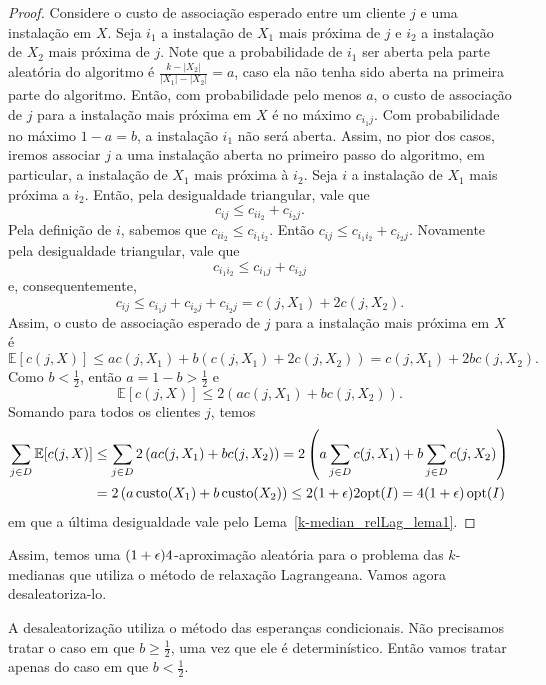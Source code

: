 \begin{proof}
Considere o custo de associação esperado entre um cliente $j$ e uma instalação em $X$. Seja $i_1$ a instalação de $X_1$ mais próxima de $j$ e $i_2$ a instalação de $X_2$ mais próxima de $j$. Note que a probabilidade de $i_1$ ser aberta pela parte aleatória do algoritmo é $\frac{k - |X_2|}{|X_1| - |X_2|} = a$, caso ela não tenha sido aberta na primeira parte do algoritmo. Então, com probabilidade pelo menos $a$, o custo de associação de $j$ para a instalação mais próxima em $X$ é no máximo $c_{i_1j}$. Com probabilidade no máximo $1 - a = b$, a instalação $i_1$ não será aberta. Assim, no pior dos casos, iremos associar $j$ a uma instalação aberta no primeiro passo do algoritmo, em particular, a instalação de $X_1$ mais próxima à $i_2$. Seja $i$ a instalação  de $X_1$ mais próxima a $i_2$. Então, pela desigualdade triangular, vale que
\[c_{ij} \leq c_{ii_2} + c_{i_2j}.\]
Pela definição de $i$, sabemos que $c_{ii_2} \leq c_{i_1i_2}$. Então \(c_{ij} \leq c_{i_1i_2} + c_{i_2j}\). Novamente pela desigualdade triangular, vale que 
\[c_{i_1i_2} \leq c_{i_1j} + c_{i_2j}\]
e, consequentemente,
\[c_{ij} \leq c_{i_1j} + c_{i_2j} + c_{i_2j} = c(j,X_1) + 2 c(j,X_2).\]
Assim, o custo de associação esperado de $j$ para a instalação mais próxima em $X$ é
\[\mathbb{E}[c(j,X)] \leq a c\left(j,X_1\right) + b\left(c(j,X_1) + 2 c(j,X_2)\right) = c(j,X_1) + 2bc(j,X_2).\] 
Como $b < \frac{1}{2}$, então $a = 1 - b > \frac{1}{2}$ e 
\[\mathbb{E}[c(j,X)] \leq 2\left( a c(j,X_1) + bc(j,X_2)\right).\]
Somando para todos os clientes $j$, temos
\begin{subequations}
    \begin{align*}
        \sum_{j \in D}\mathbb{E}[c(j,X)] &\leq \sum_{j \in D}2\left( a c(j,X_1) + bc(j,X_2)\right) = 2\left(a \sum_{j\in D} c(j,X_1) + b \sum_{j \in D} c(j,X_2)\right) \\
        & = 2\left( a\, \mathrm{custo}(X_1) + b\, \mathrm{custo}(X_2)\right) \leq 2 (1 + \epsilon) 2 \mathrm{opt}(I) = 4(1+\epsilon)\, \mathrm{opt}(I)
    \end{align*}
\end{subequations}
em que a última desigualdade vale pelo Lema~\ref{k-median_relLag_lema1}.
\end{proof}

Assim, temos uma $(1 + \epsilon)4$-aproximação aleatória para o problema das $k$-medianas que utiliza o método de relaxação Lagrangeana. Vamos agora desaleatoriza-lo.

A desaleatorização utiliza o método das esperanças condicionais. Não precisamos tratar o caso em que $b \geq \frac{1}{2}$, uma vez que ele é determinístico. Então vamos tratar apenas do caso em que $b < \frac{1}{2}$.

